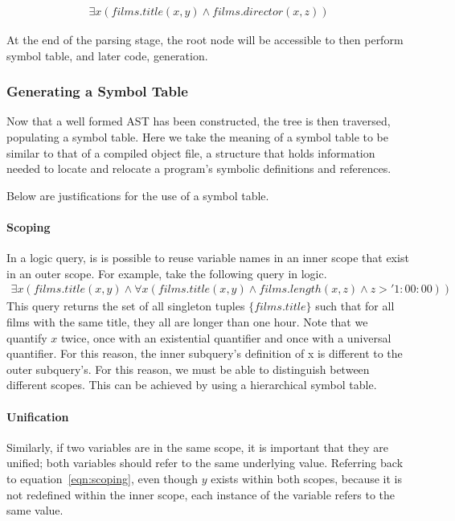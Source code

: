 \documentclass[a4paper, 11pt]{article}
\begin{document}
      \begin{gather}
        \exists x(films.title(x, y) \land films.director(x, z))
      \end{gather}


      At the end of the parsing stage, the root
      node will be accessible to then perform symbol table, and later code,
      generation.

    \subsubsection{Generating a Symbol Table}

      Now that a well formed AST has been constructed, the tree is then
      traversed, populating a symbol table. Here we take the meaning of a
      symbol table to be similar to that of a compiled object file, a structure
      that holds information needed to locate and relocate a program's symbolic
      definitions and references.\cite{symtab}

      Below are justifications for the use of a symbol table.

      \paragraph{Scoping}
        In a logic query, is is possible to reuse variable names in an inner
        scope that exist in an outer scope. For example, take the following
        query in logic.
        \begin{multline}
        \exists x(films.title(x, y) \land \forall x(films.title(x, y) \land
        films.length(x, z) \land z > '1:00:00)) \label{eqn:scoping}
        \end{multline}
        This query returns the set of all singleton tuples $\{films.title\}$ such
        that for all films with the same title, they all are longer than one
        hour. Note that we quantify $x$ twice, once with an existential
        quantifier and once with a universal quantifier. For this reason, the
        inner subquery's definition of x is different to the outer subquery's.
        For this reason, we must be able to distinguish between different
        scopes. This can be achieved by using a hierarchical symbol table.

      \paragraph{Unification}
        Similarly, if two variables are in the same scope, it is important that
        they are unified; both variables should refer to the same underlying
        value. Referring back to equation~\ref{eqn:scoping}, even
        though $y$ exists within both scopes, because it is not redefined
        within the inner scope, each instance of the variable refers to the 
        same value.
\end{document}
